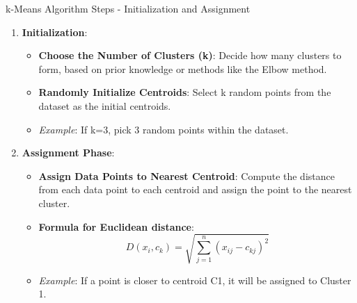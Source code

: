 \documentclass[aspectratio=169]{beamer}
\begin{document}
\begin{frame}[fragile]{k-Means Algorithm Steps - Initialization and Assignment}
    \begin{enumerate}
        \item \textbf{Initialization}:
            \begin{itemize}
                \item \textbf{Choose the Number of Clusters (k)}: 
                    Decide how many clusters to form, based on prior knowledge or methods like the Elbow method.
                \item \textbf{Randomly Initialize Centroids}: 
                    Select k random points from the dataset as the initial centroids.
                \item \textit{Example}: If k=3, pick 3 random points within the dataset.
            \end{itemize}

        \item \textbf{Assignment Phase}:
            \begin{itemize}
                \item \textbf{Assign Data Points to Nearest Centroid}: 
                    Compute the distance from each data point to each centroid and assign the point to the nearest cluster.
                \item \textbf{Formula for Euclidean distance}:
                    \begin{equation}
                        D(x_i, c_k) = \sqrt{\sum_{j=1}^{n}(x_{ij} - c_{kj})^2}
                    \end{equation}
                \item \textit{Example}: If a point is closer to centroid C1, it will be assigned to Cluster 1.
            \end{itemize}
    \end{enumerate}
\end{frame}
\end{document}
